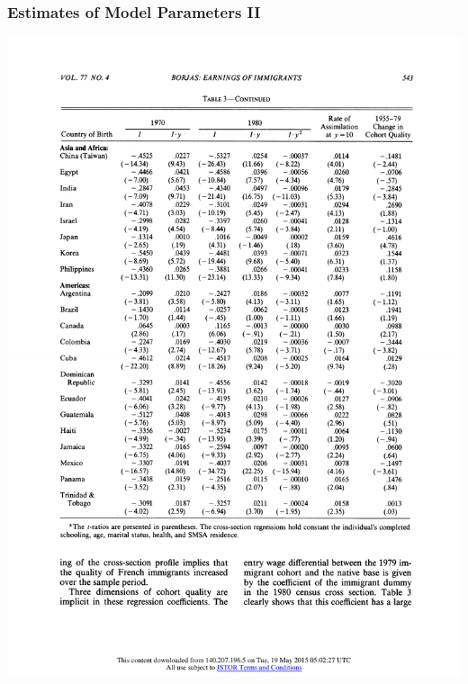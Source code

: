 \documentclass[10pt]{beamer}
\begin{document}
\begin{frame}[t]\frametitle{Estimates of Model Parameters II}

\centerline{\includegraphics[height=0.9\textheight]{ModReg2.pdf}}

\end{frame}
\end{document}

